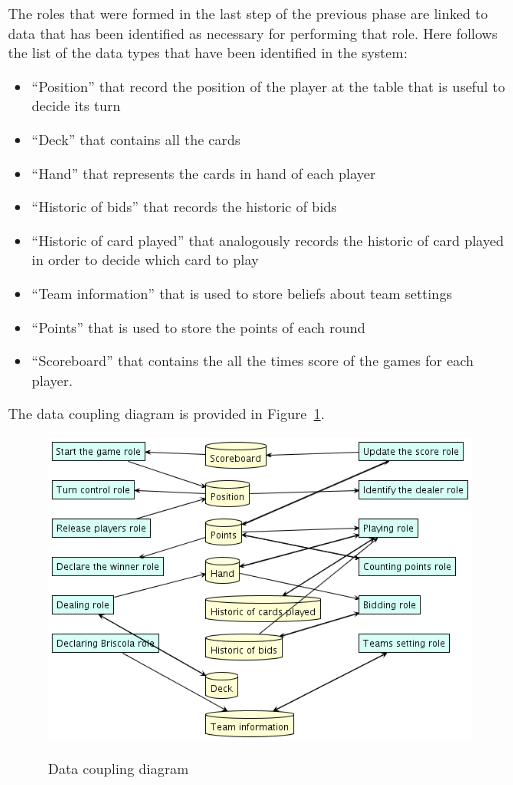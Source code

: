 \documentclass[a4paper]{article}
\begin{document}
The roles that were formed in the last step of the previous phase are linked to data that has been identified as necessary for performing that role. Here follows the list of the data types that have been identified in the system: 
\begin{itemize}
  \item ``Position'' that record the position of the player at the table that is useful to decide its turn
  \item ``Deck'' that contains all the cards
  \item ``Hand'' that represents the cards in hand of each player
  \item ``Historic of bids'' that records the historic of bids
  \item ``Historic of card played'' that analogously records the historic of card played in order to decide which card to play
  \item ``Team information'' that is used to store beliefs about team settings
  \item ``Points'' that is used to store the points of each round
  \item ``Scoreboard'' that contains the all the times score of the games for each player. 
\end{itemize}

The data coupling diagram is provided in Figure~\ref{fig:datacoupl}.

\begin{figure}[htp]
  \centering
  \includegraphics[keepaspectratio,scale=0.45]{pdt/images/architectural_design/data_coupling.png}
  \label{fig:datacoupl}
  \caption{Data coupling diagram}
\end{figure}
\end{document}
